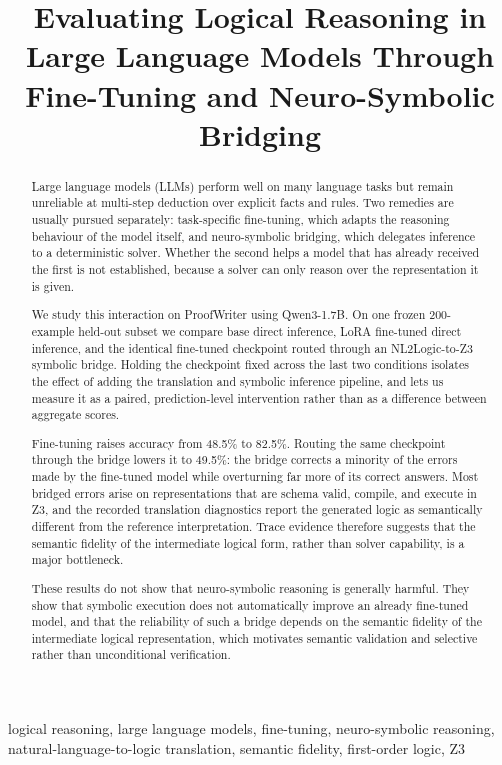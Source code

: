\documentclass[conference]{IEEEtran}
\title{Evaluating Logical Reasoning in Large Language Models Through Fine-Tuning and Neuro-Symbolic Bridging}
\author{\IEEEauthorblockN{Anonymous Author(s)}
\IEEEauthorblockA{Anonymous submission}}
\begin{document}
\maketitle
\begin{abstract}
Large language models (LLMs) perform well on many language tasks but remain unreliable at multi-step deduction over explicit facts and rules. Two remedies are usually pursued separately: task-specific fine-tuning, which adapts the reasoning behaviour of the model itself, and neuro-symbolic bridging, which delegates inference to a deterministic solver. Whether the second helps a model that has already received the first is not established, because a solver can only reason over the representation it is given.

We study this interaction on ProofWriter using Qwen3-1.7B. On one frozen 200-example held-out subset we compare base direct inference, LoRA fine-tuned direct inference, and the identical fine-tuned checkpoint routed through an NL2Logic-to-Z3 symbolic bridge. Holding the checkpoint fixed across the last two conditions isolates the effect of adding the translation and symbolic inference pipeline, and lets us measure it as a paired, prediction-level intervention rather than as a difference between aggregate scores.

Fine-tuning raises accuracy from 48.5\% to 82.5\%. Routing the same checkpoint through the bridge lowers it to 49.5\%: the bridge corrects a minority of the errors made by the fine-tuned model while overturning far more of its correct answers. Most bridged errors arise on representations that are schema valid, compile, and execute in Z3, and the recorded translation diagnostics report the generated logic as semantically different from the reference interpretation. Trace evidence therefore suggests that the semantic fidelity of the intermediate logical form, rather than solver capability, is a major bottleneck.

These results do not show that neuro-symbolic reasoning is generally harmful. They show that symbolic execution does not automatically improve an already fine-tuned model, and that the reliability of such a bridge depends on the semantic fidelity of the intermediate logical representation, which motivates semantic validation and selective rather than unconditional verification.

\end{abstract}

\begin{IEEEkeywords}
logical reasoning, large language models, fine-tuning, neuro-symbolic reasoning, natural-language-to-logic translation, semantic fidelity, first-order logic, Z3
\end{IEEEkeywords}
\end{document}
